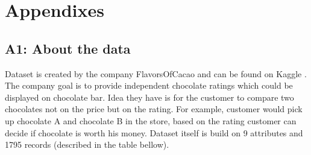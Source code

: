 \section{Appendixes}
\subsection{A1: About the data}
Dataset is created by the company FlavorsOfCacao and can be found on Kaggle \parencite{web:FlavorsOfCacaoDataset}. The company goal is to provide independent chocolate ratings which could be displayed on chocolate bar. Idea they have is for the customer to compare two chocolates not on the price but on the rating. For example, customer would pick up chocolate A and chocolate B in the store, based on the rating customer can decide if chocolate is worth his money.
Dataset itself is build on 9 attributes and 1795 records (described in the table bellow).

